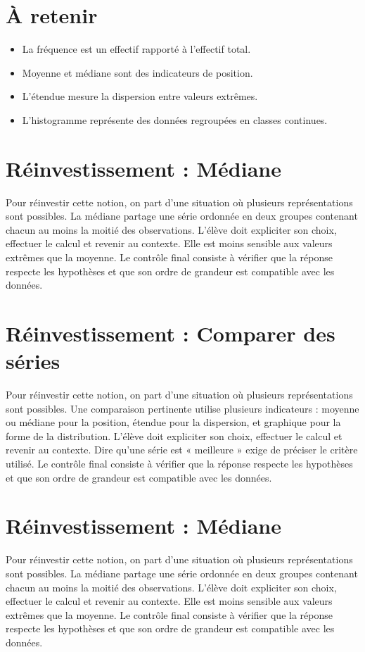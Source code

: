 \section{À retenir}
\begin{aretenir}
\begin{itemize}
\item La fréquence est un effectif rapporté à l’effectif total.
\item Moyenne et médiane sont des indicateurs de position.
\item L’étendue mesure la dispersion entre valeurs extrêmes.
\item L’histogramme représente des données regroupées en classes continues.
\end{itemize}
\end{aretenir}

\section{Réinvestissement : Médiane}
Pour réinvestir cette notion, on part d’une situation où plusieurs représentations sont possibles. La médiane partage une série ordonnée en deux groupes contenant chacun au moins la moitié des observations. L’élève doit expliciter son choix, effectuer le calcul et revenir au contexte. Elle est moins sensible aux valeurs extrêmes que la moyenne. Le contrôle final consiste à vérifier que la réponse respecte les hypothèses et que son ordre de grandeur est compatible avec les données.

\section{Réinvestissement : Comparer des séries}
Pour réinvestir cette notion, on part d’une situation où plusieurs représentations sont possibles. Une comparaison pertinente utilise plusieurs indicateurs : moyenne ou médiane pour la position, étendue pour la dispersion, et graphique pour la forme de la distribution. L’élève doit expliciter son choix, effectuer le calcul et revenir au contexte. Dire qu’une série est « meilleure » exige de préciser le critère utilisé. Le contrôle final consiste à vérifier que la réponse respecte les hypothèses et que son ordre de grandeur est compatible avec les données.

\section{Réinvestissement : Médiane}
Pour réinvestir cette notion, on part d’une situation où plusieurs représentations sont possibles. La médiane partage une série ordonnée en deux groupes contenant chacun au moins la moitié des observations. L’élève doit expliciter son choix, effectuer le calcul et revenir au contexte. Elle est moins sensible aux valeurs extrêmes que la moyenne. Le contrôle final consiste à vérifier que la réponse respecte les hypothèses et que son ordre de grandeur est compatible avec les données.
